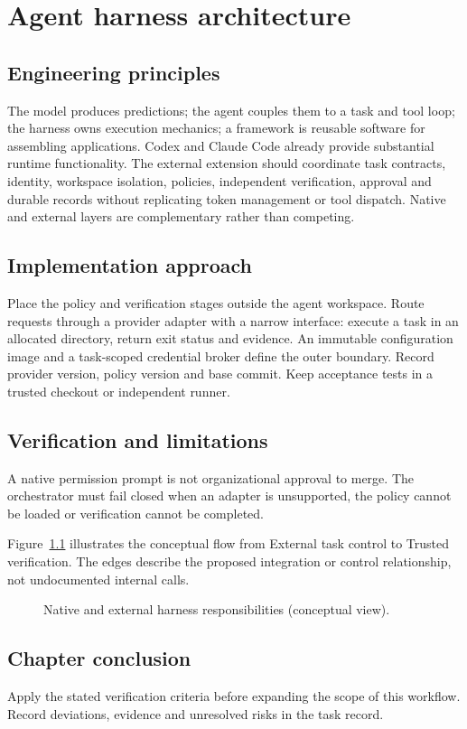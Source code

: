 \chapter{Agent harness architecture}

\section{Engineering principles}

The model produces predictions; the agent couples them to a task and tool loop; the harness owns execution mechanics; a framework is reusable software for assembling applications. Codex and Claude Code already provide substantial runtime functionality. The external extension should coordinate task contracts, identity, workspace isolation, policies, independent verification, approval and durable records without replicating token management or tool dispatch. Native and external layers are complementary rather than competing.

\section{Implementation approach}

Place the policy and verification stages outside the agent workspace. Route requests through a provider adapter with a narrow interface: execute a task in an allocated directory, return exit status and evidence. An immutable configuration image and a task-scoped credential broker define the outer boundary. Record provider version, policy version and base commit. Keep acceptance tests in a trusted checkout or independent runner.

\section{Verification and limitations}

A native permission prompt is not organizational approval to merge. The orchestrator must fail closed when an adapter is unsupported, the policy cannot be loaded or verification cannot be completed.

Figure~\ref{fig:d2} illustrates the conceptual flow from External task control to Trusted verification. The edges describe the proposed integration or control relationship, not undocumented internal calls.

\begin{figure}[htbp]\centering\caption{Native and external harness responsibilities (conceptual view).}\label{fig:d2}\end{figure}

\section{Chapter conclusion}

Apply the stated verification criteria before expanding the scope of this workflow. Record deviations, evidence and unresolved risks in the task record.
